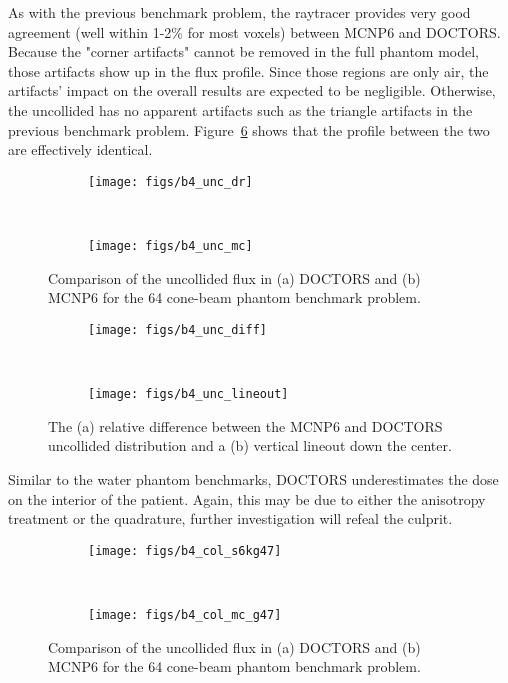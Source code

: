 As with the previous benchmark problem, the raytracer provides very good agreement (well within 1-2\% for most voxels) between MCNP6 and DOCTORS. Because the "corner artifacts" cannot be removed in the full phantom model, those artifacts show up in the flux profile. Since those regions are only air, the artifacts' impact on the overall results are expected to be negligible. Otherwise, the uncollided has no apparent artifacts such as the triangle artifacts in the previous benchmark problem. Figure~\ref{fig:b4_unc_diffs} shows that the profile between the two are effectively identical.

\begin{figure}
    \centering
    \begin{subfigure}[b]{0.45\textwidth}
        \texttt{[image: figs/b4\_unc\_dr]}
        \caption{}
        \label{fig:b4_unc_dr}
    \end{subfigure}
    ~
    \begin{subfigure}[b]{0.45\textwidth}
        \texttt{[image: figs/b4\_unc\_mc]}
        \caption{}
        \label{fig:b4_unc_mc}
    \end{subfigure}
    \caption{Comparison of the uncollided flux in (a) DOCTORS and (b) MCNP6 for the 64 cone-beam phantom benchmark problem.}\label{fig:b4_unc}
\end{figure}

\begin{figure}
    \centering
    \begin{subfigure}[b]{0.45\textwidth}
        \texttt{[image: figs/b4\_unc\_diff]}
        \caption{}
        \label{fig:b4_unc_diff}
    \end{subfigure}
    ~
    \begin{subfigure}[b]{0.45\textwidth}
        \texttt{[image: figs/b4\_unc\_lineout]}
        \caption{}
        \label{fig:b4_unc_diff_lineout}
    \end{subfigure}
    \caption{The (a) relative difference between the MCNP6 and DOCTORS uncollided distribution and a (b) vertical lineout down the center.}\label{fig:b4_unc_diffs}
\end{figure}

Similar to the water phantom benchmarks, DOCTORS underestimates the dose on the interior of the patient. Again, this may be due to either the anisotropy treatment or the quadrature, further investigation will refeal the culprit.

\begin{figure}
    \centering
    \begin{subfigure}[b]{0.45\textwidth}
        \texttt{[image: figs/b4\_col\_s6kg47]}
        \caption{}
        \label{fig:b4_col_s6kg47}
    \end{subfigure}
    ~
    \begin{subfigure}[b]{0.45\textwidth}
        \texttt{[image: figs/b4\_col\_mc\_g47]}
        \caption{}
        \label{fig:b4_col_mc_g47}
    \end{subfigure}
    \caption{Comparison of the uncollided flux in (a) DOCTORS and (b) MCNP6 for the 64 cone-beam phantom benchmark problem.}\label{fig:b4_col}
\end{figure}

